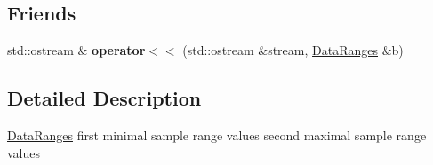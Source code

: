 \subsection*{Friends}
\begin{DoxyCompactItemize}
\item 
\hypertarget{classffactory_1_1_data_ranges_a6f74e94fd009b6d282fc27fd7b604cb0}{std\-::ostream \& {\bfseries operator$<$$<$} (std\-::ostream \&stream, \hyperlink{classffactory_1_1_data_ranges}{Data\-Ranges} \&b)}\label{classffactory_1_1_data_ranges_a6f74e94fd009b6d282fc27fd7b604cb0}

\end{DoxyCompactItemize}


\subsection{Detailed Description}
\hyperlink{classffactory_1_1_data_ranges}{Data\-Ranges} first minimal sample range values second maximal sample range values 


